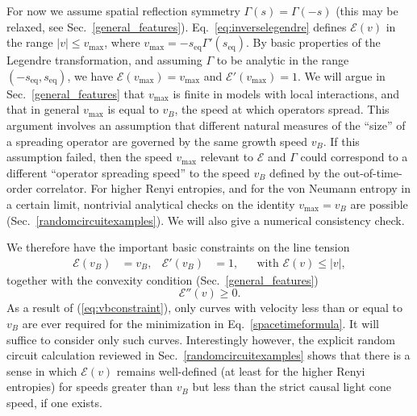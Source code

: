 \documentclass[aps,prx,twocolumn,superscriptaddress,floatfix,nofootinbib,prx]{revtex4}
\renewcommand{\>}{\right\rangle}
\newcommand{\<}{\left\langle}
\newcommand{\ba}{\begin{align}}
\newcommand{\be}{\begin{equation}}
\newcommand{\ee}{\end{equation}}
\newcommand{\seq}{s_\text{eq}}
\newcommand{\lt}{\mathcal{E}}
\begin{document}
For now we  assume spatial reflection symmetry ${\Gamma(s)= \Gamma(-s)}$ (this may be relaxed, see  Sec.~\ref{general_features}).
Eq.~\ref{eq:inverselegendre} defines $\lt(v)$  in the range ${|v|\leq v_\text{max}}$, where ${v_\text{max}=-\seq \Gamma'(\seq)}$. By basic properties of the Legendre transformation, and assuming $\Gamma$ to be analytic in the range $(-\seq, \seq)$, we have $\lt(v_\text{max}) = v_\text{max}$ and $\lt'(v_\text{max}) = 1$.
We will argue in Sec.~\ref{general_features} that $v_\text{max}$ is finite in models with local interactions, and that in general  $v_\text{max}$ is equal to $v_B$, the speed at which operators spread. 
 This argument involves an assumption that different natural measures of the ``size'' of a spreading operator 
are governed by the same growth speed $v_B$. 
If this assumption failed, then the speed $v_\text{max}$ 
relevant to $\lt$ and $\Gamma$ could correspond to a different ``operator spreading speed'' to the speed $v_B$ defined by the out-of-time-order correlator.
For  higher Renyi entropies, and for the von Neumann entropy in a certain limit,  nontrivial analytical checks on the identity $v_\text{max}=v_B$ are possible (Sec.~\ref{randomcircuitexamples}). We will also give a numerical consistency check.

We therefore have the important basic constraints on the line tension
\ba
\label{eq:vbconstraint}
\lt(v_B) &= v_B, & \lt'(v_B) & =1, &
&\text{with $\lt(v) \leq |v|$},
\end{align}  
together with the convexity condition  (Sec.~\ref{general_features})
\be\label{eq:convexity}
\lt''(v)\geq 0.
\ee
As a result of (\ref{eq:vbconstraint}), only curves with velocity less than or equal to ${v_B}$ are ever required for the minimization in Eq.~\ref{spacetimeformula}. It will suffice to consider only such curves. Interestingly however, the explicit random circuit calculation reviewed in Sec.~\ref{randomcircuitexamples} shows that there is a sense in which $\lt(v)$  remains well-defined (at least for the higher Renyi entropies) for speeds greater than $v_B$ but less than the strict causal light cone speed, if one exists.
\end{document}
